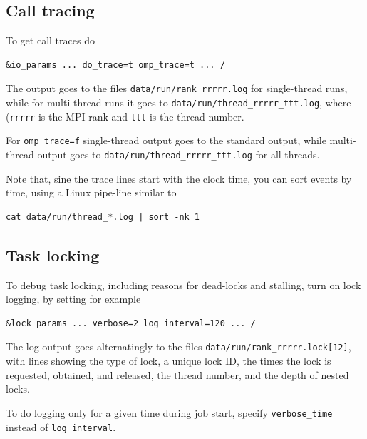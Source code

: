 \documentclass[paper=a4,fontsize=11pt]{scrartcl}
\numberwithin{equation}{section}		%
\numberwithin{figure}{section}			%
\numberwithin{table}{section}				%
\newcommand{\codecolor}{\color{Blue}}
\newcommand{\inputcolor}{\color{Blue}}
\newcommand{\cmdcolor}{\color{ForestGreen}}
\newcommand{\filecolor}{\color{NavyBlue}}
\newcommand{\File}[1]{{\filecolor\texttt{#1}}}
\newcommand{\Code}[1]{{\codecolor\texttt{#1}}}
\begin{document}
\subsection{Call tracing}
To get call traces do
{\inputcolor
\begin{verbatim}
&io_params ... do_trace=t omp_trace=t ... /
\end{verbatim}
}
The output goes to the files \File{data/run/rank\_rrrrr.log} for single-thread runs, while for multi-thread runs it goes to \File{data/run/thread\_rrrrr\_ttt.log}, where (\Code{rrrrr} is the MPI rank and \Code{ttt} is the thread number. 

For \Code{omp\_trace=f} single-thread output goes to the standard output, while multi-thread output goes to \File{data/run/thread\_rrrrr\_ttt.log} for all threads.

Note that, sine the trace lines start with the clock time, you can sort events by time, using a Linux pipe-line similar to
{\cmdcolor
\begin{verbatim}
cat data/run/thread_*.log | sort -nk 1
\end{verbatim}
}

\subsection{Task locking}
To debug task locking, including reasons for dead-locks and stalling, turn on lock logging, by setting for example
{\inputcolor
\begin{verbatim}
&lock_params ... verbose=2 log_interval=120 ... /
\end{verbatim}
}
The log output goes alternatingly to the files \File{data/run/rank\_rrrrr.lock[12]}, with lines showing the type of lock, a unique lock ID, the times the lock is requested, obtained, and released, the thread number, and the depth of nested locks.

To do logging only for a given time during job start, specify \Code{verbose\_time} instead of \Code{log\_interval}. 

\end{document}
